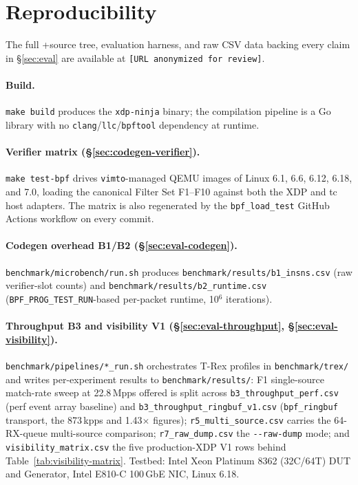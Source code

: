\section{Reproducibility}
\label{app:reproducibility}

The full \kunai+\xdpninja source tree, evaluation harness, and raw
CSV data backing every claim in \S\ref{sec:eval} are available at
\texttt{[URL anonymized for review]}.

\paragraph{Build.} \texttt{make build} produces the
\texttt{xdp-ninja} binary; the \kunai compilation pipeline is a Go
library with no \texttt{clang}/\texttt{llc}/\texttt{bpftool}
dependency at runtime.

\paragraph{Verifier matrix (\S\ref{sec:codegen-verifier}).}
\texttt{make test-bpf} drives \texttt{vimto}-managed QEMU images of
Linux 6.1, 6.6, 6.12, 6.18, and 7.0, loading the canonical Filter Set
F1--F10 against both the XDP and tc host adapters. The matrix is
also regenerated by the \texttt{bpf\_load\_test} GitHub Actions
workflow on every commit.

\paragraph{Codegen overhead B1/B2 (\S\ref{sec:eval-codegen}).}
\texttt{benchmark/microbench/run.sh} produces
\texttt{benchmark/results/b1\_insns.csv} (raw verifier-slot counts)
and \texttt{benchmark/results/b2\_runtime.csv}
(\texttt{BPF\_PROG\_TEST\_RUN}-based per-packet runtime, 10$^6$
iterations).

\paragraph{Throughput B3 and visibility V1 (\S\ref{sec:eval-throughput}, \S\ref{sec:eval-visibility}).}
\texttt{benchmark/pipelines/*\_run.sh} orchestrates T-Rex profiles
in \texttt{benchmark/trex/} and writes per-experiment results to
\texttt{benchmark/results/}: F1 single-source match-rate sweep at
22.8\,Mpps offered is split across
\texttt{b3\_throughput\_perf.csv} (perf event array baseline) and
\texttt{b3\_throughput\_ringbuf\_v1.csv} (\texttt{bpf\_ringbuf}
transport, the 873\,kpps and 1.43$\times$ figures);
\texttt{r5\_multi\_source.csv} carries the 64-RX-queue multi-source
comparison; \texttt{r7\_raw\_dump.csv} the
\texttt{-{}-raw-dump} mode; and
\texttt{visibility\_matrix.csv} the five production-XDP V1 rows
behind Table~\ref{tab:visibility-matrix}. Testbed: Intel Xeon
Platinum 8362 (32C/64T) DUT and Generator, Intel E810-C
100\,GbE NIC, Linux 6.18.
